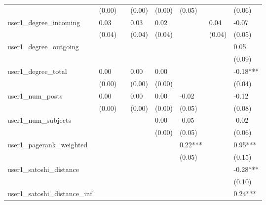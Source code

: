 \begin{table}
\begin{center}
\begin{tabular}{llllllll}
                                      & (0.00)   &            & (0.00)  & (0.00)  & (0.05)   &                    & (0.06)        \\
user1_degree_incoming                 & 0.03     &            & 0.03    & 0.02    &          & 0.04               & -0.07         \\
                                      & (0.04)   &            & (0.04)  & (0.04)  &          & (0.04)             & (0.05)        \\
user1_degree_outgoing                 &          &            &         &         &          &                    & 0.05          \\
                                      &          &            &         &         &          &                    & (0.09)        \\
user1_degree_total                    & 0.00     &            & 0.00    & 0.00    &          &                    & -0.18***      \\
                                      & (0.00)   &            & (0.00)  & (0.00)  &          &                    & (0.04)        \\
user1_num_posts                       & 0.00     &            & 0.00    & 0.00    & -0.02    &                    & -0.12         \\
                                      & (0.00)   &            & (0.00)  & (0.00)  & (0.05)   &                    & (0.08)        \\
user1_num_subjects                    &          &            &         & 0.00    & -0.05    &                    & -0.02         \\
                                      &          &            &         & (0.00)  & (0.05)   &                    & (0.06)        \\
user1_pagerank_weighted               &          &            &         &         & 0.22***  &                    & 0.95***       \\
                                      &          &            &         &         & (0.05)   &                    & (0.15)        \\
user1_satoshi_distance                &          &            &         &         &          &                    & -0.28***      \\
                                      &          &            &         &         &          &                    & (0.10)        \\
user1_satoshi_distance_inf            &          &            &         &         &          &                    & 0.24***       \\

\end{tabular}
\end{center}
\end{table}

